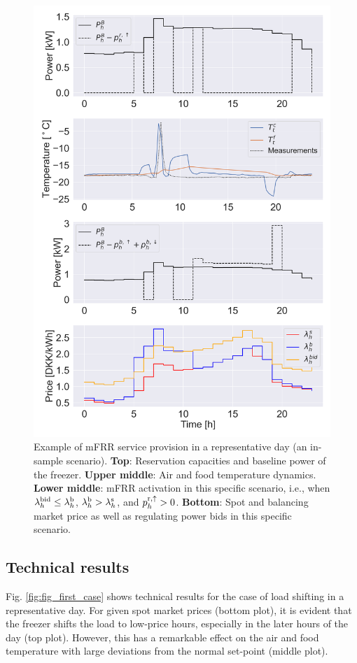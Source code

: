 \begin{figure}[t]
    \centering
\includegraphics[width=\columnwidth]{../figures/mFRR_single_case.png}
    \caption{Example of mFRR service provision in a representative day (an in-sample scenario). \textbf{Top}: Reservation capacities and baseline power of the freezer. \textbf{Upper middle}: Air and food temperature dynamics. \textbf{Lower middle}: mFRR activation in this specific scenario, i.e., when $\lambda_{h}^{\rm{bid}} \leq \lambda_{h}^{\rm{b}}$, $\lambda_{h}^{\rm{b}} > \lambda_{h}^{\rm{s}}$, and $p^{\rm{r},\uparrow}_{h} > 0$. \textbf{Bottom}: Spot and balancing market price as well as regulating power bids in this specific scenario.}
    \label{fig:fig_second_case}
\end{figure}


\subsection{Technical results}
Fig. \ref{fig:fig_first_case} shows technical results for the case of load shifting in a representative day. For given spot market prices (bottom plot), it is evident that the freezer shifts the load to low-price hours, especially in the later hours of the day (top plot). However, this has a remarkable effect on the air and food temperature with large deviations from the normal set-point (middle plot).

